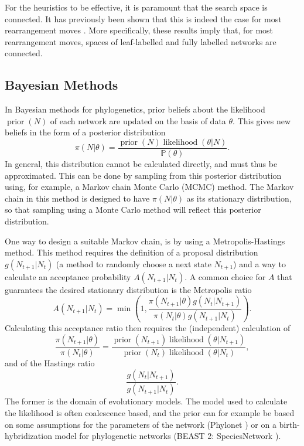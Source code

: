 \documentclass{article}
\theoremstyle{definition}
\newcommand{\PP}{\mathbb{P}}
\DeclareMathOperator{\prior}{prior}
\DeclareMathOperator{\likelihood}{likelihood}
\begin{document}
For the heuristics to be effective, it is paramount that the search space is connected. 
It has previously been shown that this is indeed the case for most rearrangement moves \cite{bordewich2017lost,janssen2018exploring,janssen2018heading,thesis_janssen}. 
More specifically, these results imply that, for most rearrangement moves, spaces of leaf-labelled and fully labelled networks are connected. 


\subsection{Bayesian Methods}
In Bayesian methods for phylogenetics, prior beliefs about the likelihood $\prior(N)$ of each network are updated on the basis of data $\theta$. This gives new beliefs in the form of a posterior distribution
\[\pi(N|\theta)=\frac{\prior(N)\likelihood(\theta|N)}{\PP(\theta)}.\] 
In general, this distribution cannot be calculated directly, and must thus be approximated. This can be done by sampling from this posterior distribution using, for example, a Markov chain Monte Carlo (MCMC) method. The Markov chain in this method is designed to have $\pi(N|\theta)$ as its stationary distribution, so that sampling using a Monte Carlo method will reflect this posterior distribution.

One way to design a suitable Markov chain, is by using a Metropolis-Hastings method. This method requires the definition of a proposal distribution $g(N_{t+1}|N_t)$ (a method to randomly choose a next state $N_{t+1}$) and a way to calculate an acceptance probability $A(N_{t+1}|N_t)$. A common choice for $A$ that guarantees the desired stationary distribution is the Metropolis ratio
\[A(N_{t+1}|N_t)=\min\left(1,\frac{\pi(N_{t+1}|\theta)g(N_{t}|N_{t+1})}{\pi(N_t|\theta)g(N_{t+1}|N_t)}\right).\]
Calculating this acceptance ratio then requires the (independent) calculation of 
\[\frac{\pi(N_{t+1}|\theta)}{\pi(N_t|\theta)} = \frac{\prior(N_{t+1})\likelihood(\theta|N_{t+1})}{\prior(N_t)\likelihood(\theta|N_t)},\]
and of the Hastings ratio 
\[\frac{g(N_{t}|N_{t+1})}{g(N_{t+1}|N_t)}.\]
The former is the domain of evolutionary models. The model used to calculate the likelihood is often coalescence based, and the prior can for example be based on some assumptions for the parameters of the network (Phylonet \cite{wen2018inferring}) or on a birth-hybridization model for phylogenetic networks (BEAST 2: SpeciesNetwork \cite{zhang2018bayesian}). 
\end{document}
